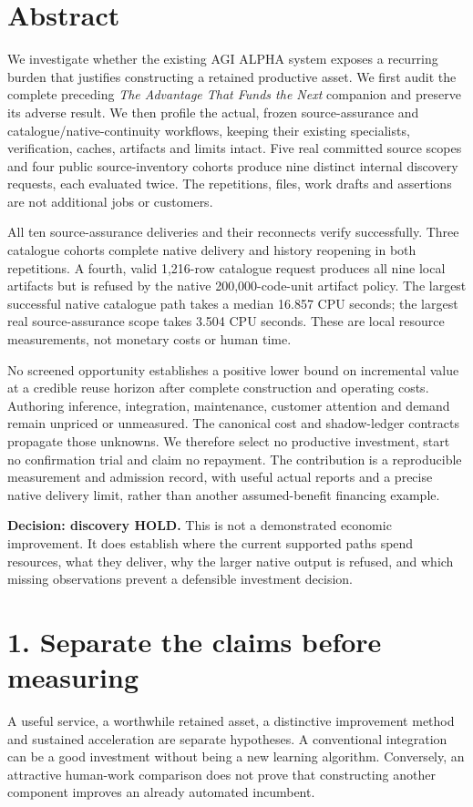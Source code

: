 \documentclass[11pt,letterpaper]{article}
\newcommand{\sect}[1]{\section*{#1}}
\newcommand{\hold}{\textcolor{amber}{\textsf{HOLD}}}
\begin{document}
\sect{Abstract}
We investigate whether the existing AGI ALPHA system exposes a recurring burden that justifies constructing a retained productive asset. We first audit the complete preceding \emph{The Advantage That Funds the Next} companion and preserve its adverse result. We then profile the actual, frozen source-assurance and catalogue/native-continuity workflows, keeping their existing specialists, verification, caches, artifacts and limits intact. Five real committed source scopes and four public source-inventory cohorts produce nine distinct internal discovery requests, each evaluated twice. The repetitions, files, work drafts and assertions are not additional jobs or customers.

All ten source-assurance deliveries and their reconnects verify successfully. Three catalogue cohorts complete native delivery and history reopening in both repetitions. A fourth, valid 1,216-row catalogue request produces all nine local artifacts but is refused by the native 200,000-code-unit artifact policy. The largest successful native catalogue path takes a median 16.857 CPU seconds; the largest real source-assurance scope takes 3.504 CPU seconds. These are local resource measurements, not monetary costs or human time.

No screened opportunity establishes a positive lower bound on incremental value at a credible reuse horizon after complete construction and operating costs. Authoring inference, integration, maintenance, customer attention and demand remain unpriced or unmeasured. The canonical cost and shadow-ledger contracts propagate those unknowns. We therefore select no productive investment, start no confirmation trial and claim no repayment. The contribution is a reproducible measurement and admission record, with useful actual reports and a precise native delivery limit, rather than another assumed-benefit financing example.

\begin{finding}
\textbf{Decision: discovery \hold.} This is not a demonstrated economic improvement. It does establish where the current supported paths spend resources, what they deliver, why the larger native output is refused, and which missing observations prevent a defensible investment decision.
\end{finding}

\sect{1. Separate the claims before measuring}
A useful service, a worthwhile retained asset, a distinctive improvement method and sustained acceleration are separate hypotheses. A conventional integration can be a good investment without being a new learning algorithm. Conversely, an attractive human-work comparison does not prove that constructing another component improves an already automated incumbent.
\end{document}
